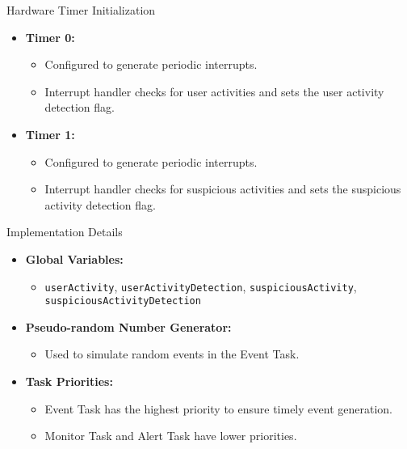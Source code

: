 \begin{frame}{Hardware Timer Initialization}
    \begin{itemize}
        \item \textbf{Timer 0:}
        \begin{itemize}
            \item Configured to generate periodic interrupts.
            \item Interrupt handler checks for user activities and sets the user activity detection flag.
        \end{itemize}
        \item \textbf{Timer 1:}
        \begin{itemize}
            \item Configured to generate periodic interrupts.
            \item Interrupt handler checks for suspicious activities and sets the suspicious activity detection flag.
        \end{itemize}
    \end{itemize}
\end{frame}

\begin{frame}{Implementation Details}
    \begin{itemize}
        \item \textbf{Global Variables:}
        \begin{itemize}
            \item \texttt{userActivity}, \texttt{userActivityDetection}, \texttt{suspiciousActivity}, \texttt{suspiciousActivityDetection}
        \end{itemize}
        \item \textbf{Pseudo-random Number Generator:}
        \begin{itemize}
            \item Used to simulate random events in the Event Task.
        \end{itemize}
        \item \textbf{Task Priorities:}
        \begin{itemize}
            \item Event Task has the highest priority to ensure timely event generation.
            \item Monitor Task and Alert Task have lower priorities.
        \end{itemize}
    \end{itemize}
\end{frame}
